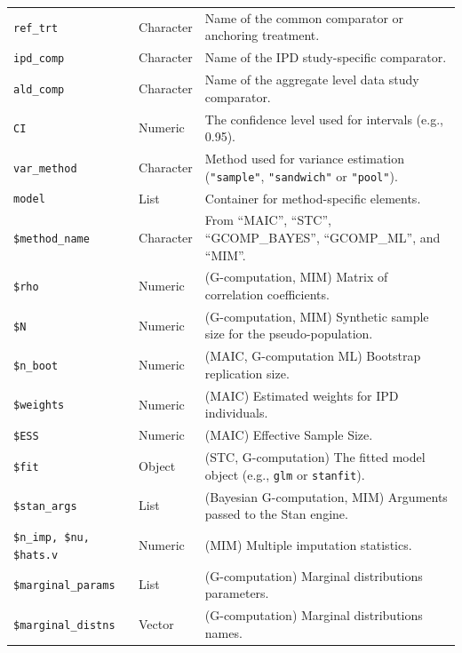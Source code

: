 \documentclass[article]{jss}
\begin{document}
\begin{table}[ht!]
\begin{tabular}{l l p{9.5cm}}
\texttt{ref\_trt} & Character & Name of the common comparator or anchoring treatment. \\
\texttt{ipd\_comp} & Character & Name of the IPD study-specific comparator. \\
\texttt{ald\_comp} & Character & Name of the aggregate level data study comparator. \\
\texttt{CI} & Numeric & The confidence level used for intervals (e.g., 0.95). \\
\texttt{var\_method} & Character & Method used for variance estimation (\texttt{"sample"}, \texttt{"sandwich"} or \texttt{"pool"}). \\
\texttt{model} & List & Container for method-specific elements. \\
\hspace{3mm} \texttt{\$method\_name} & Character & From ``MAIC'', ``STC'', ``GCOMP\_BAYES'', ``GCOMP\_ML'', and ``MIM''. \\
\hspace{3mm} \texttt{\$rho} & Numeric & (G-computation, MIM) Matrix of correlation coefficients. \\
\hspace{3mm} \texttt{\$N} & Numeric & (G-computation, MIM) Synthetic sample size for the pseudo-population. \\
\hspace{3mm} \texttt{\$n\_boot} & Numeric & (MAIC, G-computation ML) Bootstrap replication size. \\
\hspace{3mm} \texttt{\$weights} & Numeric & (MAIC) Estimated weights for IPD individuals. \\
\hspace{3mm} \texttt{\$ESS} & Numeric & (MAIC) Effective Sample Size. \\
\hspace{3mm} \texttt{\$fit} & Object & (STC, G-computation) The fitted model object (e.g., \texttt{glm} or \texttt{stanfit}). \\
\hspace{3mm} \texttt{\$stan\_args} & List & (Bayesian G-computation, MIM) Arguments passed to the Stan engine. \\
\hspace{3mm} \texttt{\$n\_imp, \$nu, \$hats.v} & Numeric & (MIM) Multiple imputation statistics. \\
\hspace{3mm} \texttt{\$marginal\_params} & List & (G-computation) Marginal distributions parameters. \\ %
\hspace{3mm} \texttt{\$marginal\_distns} & Vector & (G-computation) Marginal distributions names. \\ %
\bottomrule
\end{tabular}
\end{table}
\end{document}
